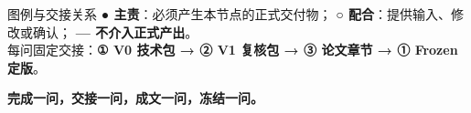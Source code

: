 \documentclass[11pt,a4paper]{ctexart}
\begin{document}
\vspace{5mm}
\begin{keybox}{图例与交接关系}
\textbf{● 主责}：必须产生本节点的正式交付物；\quad
\textbf{○ 配合}：提供输入、修改或确认；\quad
\textbf{— 不介入正式产出}。\\[2mm]
每问固定交接：\textbf{① V0 技术包 → ② V1 复核包 → ③ 论文章节 → ① Frozen 定版}。
\end{keybox}

\vfill
\begin{center}
{\large\bfseries\color{navy} 完成一问，交接一问，成文一问，冻结一问。}
\end{center}
\end{document}
